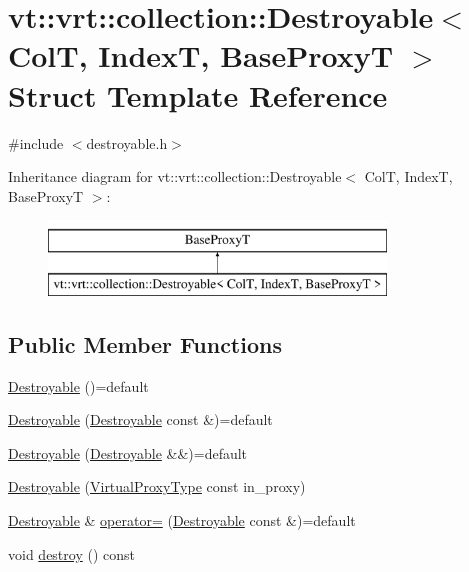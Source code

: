 \hypertarget{structvt_1_1vrt_1_1collection_1_1_destroyable}{}\section{vt\+:\+:vrt\+:\+:collection\+:\+:Destroyable$<$ ColT, IndexT, Base\+ProxyT $>$ Struct Template Reference}
\label{structvt_1_1vrt_1_1collection_1_1_destroyable}


{\ttfamily \#include $<$destroyable.\+h$>$}

Inheritance diagram for vt\+:\+:vrt\+:\+:collection\+:\+:Destroyable$<$ ColT, IndexT, Base\+ProxyT $>$\+:\begin{figure}[H]
\begin{center}
\leavevmode
\includegraphics[height=2.000000cm]{structvt_1_1vrt_1_1collection_1_1_destroyable}
\end{center}
\end{figure}
\subsection*{Public Member Functions}
\begin{DoxyCompactItemize}
\item 
\hyperlink{structvt_1_1vrt_1_1collection_1_1_destroyable_a1fd3bd7880c42a7e856dae61358a7e2d}{Destroyable} ()=default
\item 
\hyperlink{structvt_1_1vrt_1_1collection_1_1_destroyable_ac456d507cd1f88578102e9c142950583}{Destroyable} (\hyperlink{structvt_1_1vrt_1_1collection_1_1_destroyable}{Destroyable} const \&)=default
\item 
\hyperlink{structvt_1_1vrt_1_1collection_1_1_destroyable_a9e0023a2c3b0f17119410635ff438879}{Destroyable} (\hyperlink{structvt_1_1vrt_1_1collection_1_1_destroyable}{Destroyable} \&\&)=default
\item 
\hyperlink{structvt_1_1vrt_1_1collection_1_1_destroyable_aeedab2a596b9ec0741928245aa098757}{Destroyable} (\hyperlink{namespacevt_a1b417dd5d684f045bb58a0ede70045ac}{Virtual\+Proxy\+Type} const in\+\_\+proxy)
\item 
\hyperlink{structvt_1_1vrt_1_1collection_1_1_destroyable}{Destroyable} \& \hyperlink{structvt_1_1vrt_1_1collection_1_1_destroyable_a12674a0a72773cbfc36299f8e1dbcbf7}{operator=} (\hyperlink{structvt_1_1vrt_1_1collection_1_1_destroyable}{Destroyable} const \&)=default
\item 
void \hyperlink{structvt_1_1vrt_1_1collection_1_1_destroyable_a4c73173068a636f91b737ca28222c7cb}{destroy} () const
\end{DoxyCompactItemize}


